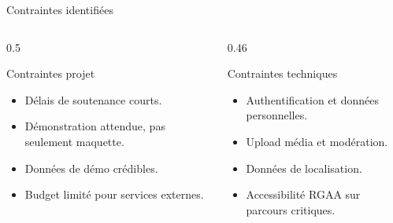 \documentclass[aspectratio=169,11pt]{beamer}
\begin{document}
\begin{frame}{Contraintes identifiées}
  \begin{columns}[T]
    \begin{column}{0.5\textwidth}
      \begin{block}{Contraintes projet}
        \begin{itemize}
          \item Délais de soutenance courts.
          \item Démonstration attendue, pas seulement maquette.
          \item Données de démo crédibles.
          \item Budget limité pour services externes.
        \end{itemize}
      \end{block}
    \end{column}
    \begin{column}{0.46\textwidth}
      \begin{block}{Contraintes techniques}
        \begin{itemize}
          \item Authentification et données personnelles.
          \item Upload média et modération.
          \item Données de localisation.
          \item Accessibilité RGAA sur parcours critiques.
        \end{itemize}
      \end{block}
    \end{column}
  \end{columns}
\end{frame}
\end{document}
